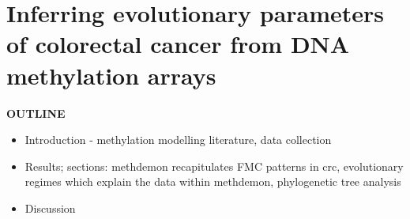 \chapter{Inferring evolutionary parameters of colorectal cancer from DNA methylation arrays}\label{chapter:methylation}
\large\textbf{OUTLINE}
\begin{itemize}
    \item Introduction - methylation modelling literature, data collection
    \item Results; sections: methdemon recapitulates FMC patterns in crc,
        evolutionary regimes which explain the data within methdemon,
        phylogenetic tree analysis
    \item Discussion
\end{itemize}



